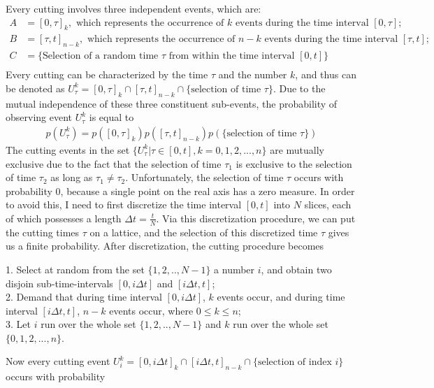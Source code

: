 \documentclass[10pt]{article}
\numberwithin{figure}{section}
\numberwithin{equation}{section}
\begin{document}
Every cutting involves three independent events, which are:
\begin{align}\nonumber
A &= [0, \tau]_{k}, \text{ which represents the occurrence of $k$ events during the time interval } [0, \tau];  \\\nonumber
B &=  [\tau, t]_{n - k}, \text{ which represents the occurrence of $n - k$ events during the time interval } [\tau, t]; \\\nonumber
C &=  \{\text{Selection of a random time $\tau$ from within the time interval } [0, t]\} \\\nonumber
\end{align}
Every cutting can be characterized by the time $\tau$ and the number $k$, and thus can be denoted as $U_{\tau}^{k} = [0, \tau]_{k} \cap [\tau, t]_{n - k}\cap \{\text{selection of time } \tau\}$. Due to the mutual independence of these three constituent sub-events, the probability of observing event $U_{\tau}^{k}$ is equal to 
\begin{eqnarray}
p(U_{\tau}^{k}) = p([0, \tau]_{k}) p([\tau, t]_{n - k}) p(\{\text{selection of time } \tau\})
\end{eqnarray}
The cutting events in the set $\{U_{\tau}^{k}\vert \tau \in [0, t], k = 0, 1, 2, ..., n\}$ are mutually exclusive due to the fact that the selection of time $\tau_1$ is exclusive to the selection of time $\tau_2$ as long as $\tau_1 \ne \tau_2$. Unfortunately, the selection of time $\tau$ occurs with probability 0, because a single point on the real axis has a zero measure. In order to avoid this, I need to first discretize the time interval $[0, t]$ into $N$ slices, each of which possesses a length $\Delta t = \frac{t}{N}$. Via this discretization procedure, we can put the cutting times $\tau$ on a lattice, and the selection of this discretized time $\tau$ gives us a finite probability. After discretization, the cutting procedure becomes 
\begin{tcolorbox}
1. Select at random from the set $\{1, 2, .., N-1\}$ a number $i$, and obtain two disjoin sub-time-intervals $[0, i\Delta t]$ and $[i\Delta t, t]$; \\
2. Demand that during time interval $[0, i\Delta t]$, $k$ events occur, and during time interval $[i\Delta t, t]$, $n - k$ events occur, where $0 \le k \le n$; \\
3. Let $i$ run over the whole set $\{1, 2, .., N-1\}$ and $k$ run over the whole set $\{0, 1, 2, ..., n\}$. \\
\end{tcolorbox}
Now every cutting event $U_{i}^{k} = [0, i\Delta t]_{k} \cap [i\Delta t, t]_{n - k}\cap \{\text{selection of index } i \}$ occurs with probability 
\end{document}
